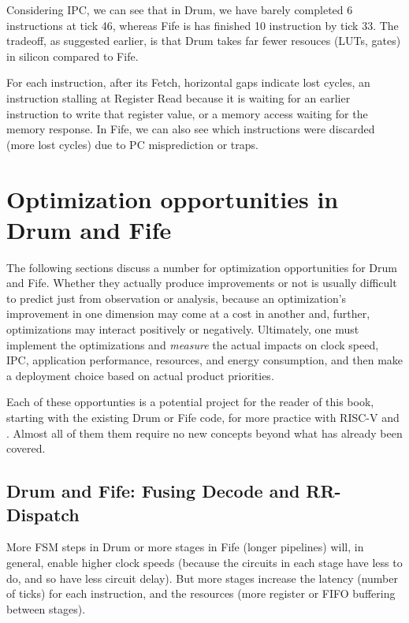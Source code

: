 Considering IPC, we can see that in Drum, we have barely completed 6
instructions at tick 46, whereas Fife is has finished 10 instruction
by tick 33.  The tradeoff, as suggested earlier, is that Drum takes
far fewer resouces (LUTs, gates) in silicon compared to Fife.

For each instruction, after its Fetch, horizontal gaps indicate lost
cycles, {\eg} an instruction stalling at Register Read because it is
waiting for an earlier instruction to write that register value, or a
memory access waiting for the memory response.  In Fife, we can also
see which instructions were discarded (more lost cycles) due to PC
misprediction or traps.


\section{Optimization opportunities in Drum and Fife}

The following sections discuss a number for optimization opportunities
for Drum and Fife.  Whether they actually produce improvements or not
is usually difficult to predict just from observation or analysis,
because an optimization's improvement in one dimension may come at a
cost in another and, further, optimizations may interact positively or
negatively.  Ultimately, one must implement the optimizations and
\emph{measure} the actual impacts on clock speed, IPC, application
performance, resources, and energy consumption, {\etc} and then make a
deployment choice based on actual product priorities.

Each of these opportunties is a potential project for the reader of
this book, starting with the existing Drum or Fife code, for more
practice with RISC-V and {\BSV}.  Almost all of them them require no new
{\BSV} concepts beyond what has already been covered.


\subsection{Drum and Fife: Fusing Decode and RR-Dispatch}

\label{Sec_Fuse_Decode_RR}

More FSM steps in Drum or more stages in Fife (longer pipelines) will,
in general, enable higher clock speeds (because the circuits in each
stage have less to do, and so have less circuit delay).  But more
stages increase the latency (number of ticks) for each instruction,
and the resources (more register or FIFO buffering between stages).

